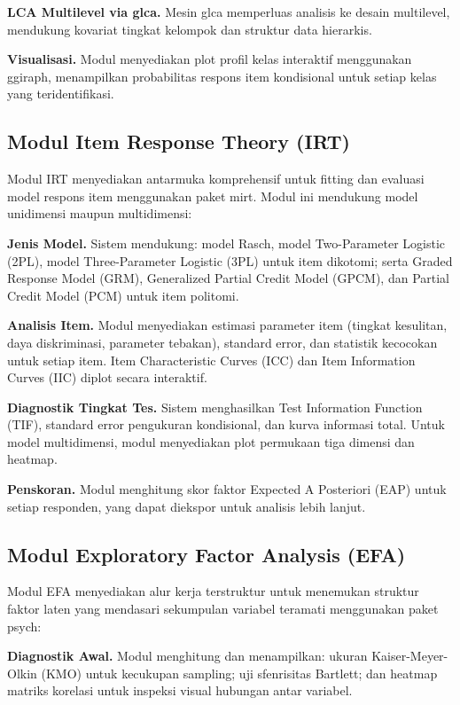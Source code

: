 \documentclass[12pt,a4paper]{article}
\begin{document}
\textbf{LCA Multilevel via glca.} Mesin glca memperluas analisis ke desain multilevel, mendukung kovariat tingkat kelompok dan struktur data hierarkis.

\textbf{Visualisasi.} Modul menyediakan plot profil kelas interaktif menggunakan ggiraph, menampilkan probabilitas respons item kondisional untuk setiap kelas yang teridentifikasi.

\subsection{Modul Item Response Theory (IRT)}

Modul IRT menyediakan antarmuka komprehensif untuk fitting dan evaluasi model respons item menggunakan paket mirt. Modul ini mendukung model unidimensi maupun multidimensi:

\textbf{Jenis Model.} Sistem mendukung: model Rasch, model Two-Parameter Logistic (2PL), model Three-Parameter Logistic (3PL) untuk item dikotomi; serta Graded Response Model (GRM), Generalized Partial Credit Model (GPCM), dan Partial Credit Model (PCM) untuk item politomi.

\textbf{Analisis Item.} Modul menyediakan estimasi parameter item (tingkat kesulitan, daya diskriminasi, parameter tebakan), standard error, dan statistik kecocokan untuk setiap item. Item Characteristic Curves (ICC) dan Item Information Curves (IIC) diplot secara interaktif.

\textbf{Diagnostik Tingkat Tes.} Sistem menghasilkan Test Information Function (TIF), standard error pengukuran kondisional, dan kurva informasi total. Untuk model multidimensi, modul menyediakan plot permukaan tiga dimensi dan heatmap.

\textbf{Penskoran.} Modul menghitung skor faktor Expected A Posteriori (EAP) untuk setiap responden, yang dapat diekspor untuk analisis lebih lanjut.

\subsection{Modul Exploratory Factor Analysis (EFA)}

Modul EFA menyediakan alur kerja terstruktur untuk menemukan struktur faktor laten yang mendasari sekumpulan variabel teramati menggunakan paket psych:

\textbf{Diagnostik Awal.} Modul menghitung dan menampilkan: ukuran Kaiser-Meyer-Olkin (KMO) untuk kecukupan sampling; uji sfenrisitas Bartlett; dan heatmap matriks korelasi untuk inspeksi visual hubungan antar variabel.
\end{document}

